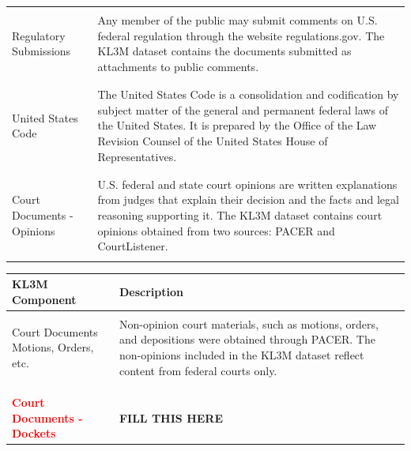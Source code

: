 \documentclass{article}
\begin{document}
\begin{appendices}
\begin{table}[h]
\begin{longtable}{ p{3cm} p{9cm} }
 \\\hline
  \\
Regulatory Submissions &
Any member of the public may submit comments on U.S. federal regulation through the website regulations.gov. The KL3M dataset contains the documents submitted as attachments to public comments. \\   
 \\\hline
  \\
United States Code &
The United States Code is a consolidation and codification by subject matter of the general and permanent federal laws of the United States. It is prepared by the Office of the Law Revision Counsel of the United States House of Representatives.
\\   
 \\\hline
  \\
Court Documents - Opinions &
U.S. federal and state court opinions are written explanations from judges that explain their decision and the facts and legal reasoning supporting it. The KL3M dataset contains court opinions obtained from two sources: PACER and CourtListener.  \\
 \\\hline
    \end{longtable}

\end{table}
\pagebreak


\begin{table}[!ht]
\scriptsize
\begin{longtable}{ p{3cm} p{9cm} }
\textbf{KL3M Component}      
& \textbf{Description}  
\\\midrule
\\
Court Documents Motions, Orders, etc. & Non-opinion court materials, such as motions, orders, and depositions were obtained through PACER. The non-opinions included in the KL3M dataset reflect content from federal courts only.   \\\\
 \\\hline
 \\
\textcolor{red}{\textbf{Court Documents - Dockets}}  
& 
\textcolor{black}{}\textbf{FILL THIS HERE}


\end{longtable}
\end{table}
\end{appendices}
\end{document}
